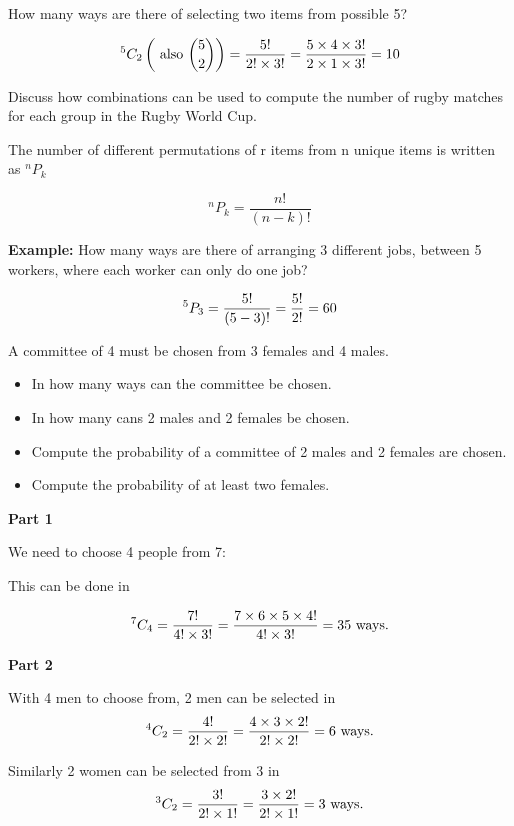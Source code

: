 \documentclass[12pt]{report}
\begin{document}
{\Large
	How many ways are there of selecting two items from possible 5?
	
	\[ ^5 C_2   \left( \mbox{ also }  {5 \choose 2}  \right) =  {5!  \over 2! \times 3!} =  {5 \times 4 \times 3!  \over 2 \times 1 \times 3!} = 10  \]
	
	\bigskip
	Discuss how combinations can be used to compute the number of rugby matches for each group in the Rugby World Cup.
	
}
{\Large
	The number of different permutations of r items from n unique items is written as $^n P_k$
	
	
	\[ ^n P_k = \frac{n!}{(n-k)!}\]
}

{\Large
	\textbf{Example:}
	How many ways are there of arranging 3 different jobs, between 5 workers, where each worker can only do one job?
	
	
	\[ ^5 P_3 = \frac{5!}{(5-3)!}  = {5! \over 2!} = 60\]
	
}



{\Large
	
	A committee of 4 must be chosen from 3 females and 4 males.
	
	\begin{itemize}
		\item In how many ways can the committee be chosen.
		\item In how many cans 2 males and 2 females be chosen.
		\item Compute the probability of a committee of 2 males and 2 females are chosen.
		\item Compute the probability of at least two females.
	\end{itemize}
}

{\Large
	
	\textbf{Part 1}
	
	We need to choose 4 people from 7:
	
	This can be done in
	
	\[
	^7 C_4  = {7!  \over 4! \times 3!} =  {7 \times 6 \times 5 \times 4!  \over 4! \times 3!} = 35 \mbox{ ways.}
	\]
	
	
	\textbf{Part 2}
	
	With 4 men to choose from, 2 men can be selected in \[
	^4 C_2  = {4!  \over 2! \times 2!} =  {4 \times 3 \times 2!  \over 2! \times 2!} = 6\mbox{ ways.}
	\]
	
	Similarly 2 women can be selected from 3 in
	\[
	^3 C_2  = {3!  \over 2! \times1!} =  {3 \times 2!  \over 2! \times 1!} = 3\mbox{ ways.}
	\]
	
}
\end{document}
